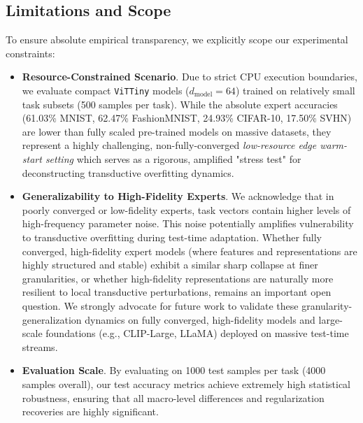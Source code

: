 \subsection{Limitations and Scope}
To ensure absolute empirical transparency, we explicitly scope our experimental constraints:
\begin{itemize}
    \item \textbf{Resource-Constrained Scenario}. Due to strict CPU execution boundaries, we evaluate compact \texttt{ViTTiny} models ($d_{\text{model}}=64$) trained on relatively small task subsets (500 samples per task). While the absolute expert accuracies (61.03\% MNIST, 62.47\% FashionMNIST, 24.93\% CIFAR-10, 17.50\% SVHN) are lower than fully scaled pre-trained models on massive datasets, they represent a highly challenging, non-fully-converged \emph{low-resource edge warm-start setting} which serves as a rigorous, amplified "stress test" for deconstructing transductive overfitting dynamics.
    \item \textbf{Generalizability to High-Fidelity Experts}. We acknowledge that in poorly converged or low-fidelity experts, task vectors contain higher levels of high-frequency parameter noise. This noise potentially amplifies vulnerability to transductive overfitting during test-time adaptation. Whether fully converged, high-fidelity expert models (where features and representations are highly structured and stable) exhibit a similar sharp collapse at finer granularities, or whether high-fidelity representations are naturally more resilient to local transductive perturbations, remains an important open question. We strongly advocate for future work to validate these granularity-generalization dynamics on fully converged, high-fidelity models and large-scale foundations (e.g., CLIP-Large, LLaMA) deployed on massive test-time streams.
    \item \textbf{Evaluation Scale}. By evaluating on 1000 test samples per task (4000 samples overall), our test accuracy metrics achieve extremely high statistical robustness, ensuring that all macro-level differences and regularization recoveries are highly significant.
\end{itemize}
